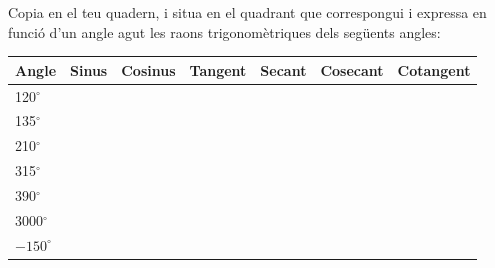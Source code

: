 \begin{mylist}	
	\exer
	Copia en el teu quadern, i situa en el quadrant que correspongui i
	expressa en funció d'un angle agut les raons trigonomètriques dels
	següents angles:
	\begin{tabular}{|p{}|p{}|p{}|p{}|p{}|p{}|p{}|}
		\toprule
		Angle & Sinus & Cosinus & Tangent & Secant & Cosecant & Cotangent \\
		\midrule
		120$^\circ$ & & & & & & \\ \hline
		135$^\circ$ & & & & & & \\ \hline
		210$^\circ$ & & & & & & \\ \hline
		315$^\circ$ & & & & & & \\ \hline
		390$^\circ$ & & & & & & \\ \hline
		3000$^\circ$ & & & & & & \\ \hline
		$-150^\circ$ & & & & & & \\  
		\bottomrule
	\end{tabular}
\end{mylist}
